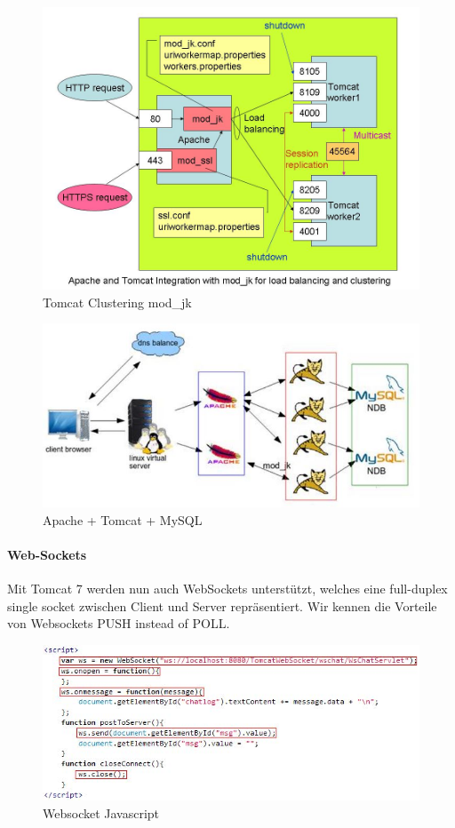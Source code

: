 \newpage
\begin{figure}[h!]
\centering
\includegraphics[width=0.7\linewidth]{fig/java-tomcat-mod-jk}
\caption{Tomcat Clustering mod\_jk}
\label{fig:java-tomcat-mod-jk}
\end{figure}

\begin{figure}[h!]
\centering
\includegraphics[width=0.7\linewidth]{fig/java-infra}
\caption{Apache + Tomcat + MySQL}
\label{fig:java-infra}
\end{figure}

\newpage
\paragraph{Web-Sockets}
Mit Tomcat 7 werden nun auch WebSockets unterstützt, welches eine full-duplex single socket zwischen Client und Server repräsentiert. Wir kennen die Vorteile von Websockets PUSH instead of POLL.

\begin{figure}[h!]
\centering
\includegraphics[width=0.7\linewidth]{fig/java-websocket-js}
\caption{Websocket Javascript}
\label{fig:java-websocket-js}
\end{figure}

